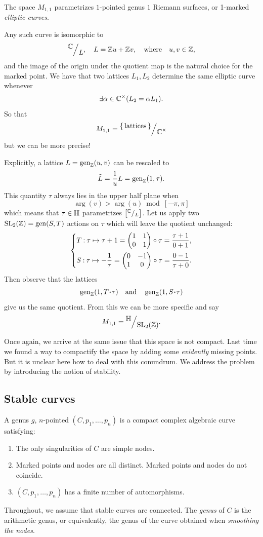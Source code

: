 \documentclass[12pt]{memoir}
\begin{document}
\begin{Ex}
    The space $M_{1,1}$ parametrizes $1$-pointed genus $1$ Riemann surfaces, or 1-marked \emph{elliptic curves}.\par
    Any such curve is isomorphic to 
    $$\quot{\bC}{L},\quad L=\bZ u+\bZ v,\word{where}u,v\in\bZ,$$
    and the image of the origin under the quotient map is the natural choice for the marked point. We have that two lattices $L_1,L_2$ determine the same elliptic curve whenever 
    $$\exists \alpha\in\mathbb{C}^\times(L_2=\alpha L_1).$$
    So that 
    $$M_{1,1}=\quot{\set{\text{lattices}}}{\bC^\x}$$
    but we can be more precise!\par
    Explicitly, a lattice $L=\operatorname{gen}_{\mathbb{Z}}(u,v)$ can be rescaled to
    $$\tilde{L}=\frac{1}{u}L=\operatorname{gen}_{\mathbb{Z}}(1,\tau).$$
    This quantity $\tau$ always lies in the upper half plane when 
    $$\arg(v)>\arg(u)\bmod[-\pi,\pi]$$
    which means that $\tau\in\mathbb{H}$ parametrizes $\bonj{\quot{\bC}{L}}$. 
    Let us apply two $\mathrm{SL}_2(\mathbb{Z})=\operatorname{gen}(S,T)$ actions on $\tau$ which will leave the quotient unchanged:
    $$
    \left\lbrace
    \begin{aligned}
        &T\mathbin{:}\tau\mapsto\tau+1=\begin{pmatrix} 1 & 1 \\ 0 & 1 \end{pmatrix}\circ\tau=\frac{\tau+1}{0+1},\\
        &S\mathbin{:}\tau\mapsto-\frac1\tau=\begin{pmatrix} 0 & -1 \\ 1 & 0 \end{pmatrix}\circ\tau=\frac{0-1}{\tau+0}.
    \end{aligned}
    \right.
    $$
    Then observe that the lattices
    $$\gen_\bZ(1,T\.\tau)\word{and}\gen_\bZ(1,S\.\tau)$$
    give us the same quotient. From this we can be more specific and say
    $$M_{1,1}=\quot{\bH}{\rSL_2(\bZ)}.$$
\end{Ex}

Once again, we arrive at the same issue that this space is not compact. Last time we found a way to compactify the space by adding some \emph{evidently} missing points. But it is unclear here how to deal with this conundrum. We address the problem by introducing the notion of stability.

\subsection{Stable curves}

\begin{Def}
    A genus $g$, $n$-pointed  $(C,p_1,\dots,p_n)$ is a compact complex algebraic curve satisfying:
    \begin{enumerate}
        \item The only singularities of $C$ are simple nodes.
        \item Marked points and nodes are all distinct. Marked points and nodes do not coincide.
        \item\label{fin-number-auts} $(C,p_1,\dots,p_n)$ has a finite number of automorphisms.
    \end{enumerate}
    Throughout, we assume that stable curves are connected. The \emph{genus} of $C$ is the arithmetic genus, or equivalently, the genus of the curve obtained when \emph{smoothing the nodes}.
\end{Def}
\end{document}
